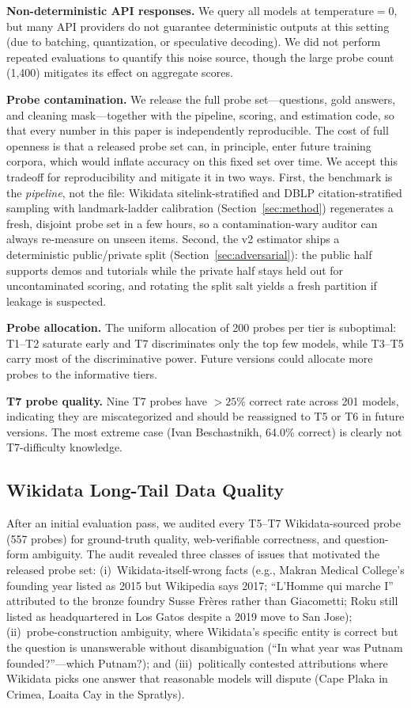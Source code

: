 \documentclass[11pt]{article}
\begin{document}
\textbf{Non-deterministic API responses.} We query all models at temperature${}=0$, but many API providers do not guarantee deterministic outputs at this setting (due to batching, quantization, or speculative decoding). We did not perform repeated evaluations to quantify this noise source, though the large probe count (1{,}400) mitigates its effect on aggregate scores.

\textbf{Probe contamination.} We release the full probe set---questions, gold answers, and cleaning mask---together with the pipeline, scoring, and estimation code, so that every number in this paper is independently reproducible. The cost of full openness is that a released probe set can, in principle, enter future training corpora, which would inflate accuracy on this fixed set over time. We accept this tradeoff for reproducibility and mitigate it in two ways. First, the benchmark is the \emph{pipeline}, not the file: Wikidata sitelink-stratified and DBLP citation-stratified sampling with landmark-ladder calibration (Section~\ref{sec:method}) regenerates a fresh, disjoint probe set in a few hours, so a contamination-wary auditor can always re-measure on unseen items. Second, the v2 estimator ships a deterministic public/private split (Section~\ref{sec:adversarial}): the public half supports demos and tutorials while the private half stays held out for uncontaminated scoring, and rotating the split salt yields a fresh partition if leakage is suspected.

\textbf{Probe allocation.} The uniform allocation of 200 probes per tier is suboptimal: T1--T2 saturate early and T7 discriminates only the top few models, while T3--T5 carry most of the discriminative power. Future versions could allocate more probes to the informative tiers.

\textbf{T7 probe quality.} Nine T7 probes have $>25\%$ correct rate across 201 models, indicating they are miscategorized and should be reassigned to T5 or T6 in future versions. The most extreme case (Ivan Beschastnikh, 64.0\% correct) is clearly not T7-difficulty knowledge.

\subsection{Wikidata Long-Tail Data Quality}
\label{sec:wikidata-audit}

After an initial evaluation pass, we audited every T5--T7 Wikidata-sourced probe (557 probes) for ground-truth quality, web-verifiable correctness, and question-form ambiguity. The audit revealed three classes of issues that motivated the released probe set: (i)~Wikidata-itself-wrong facts (e.g., Makran Medical College's founding year listed as 2015 but Wikipedia says 2017; ``L'Homme qui marche I'' attributed to the bronze foundry Susse Fr\`{e}res rather than Giacometti; Roku still listed as headquartered in Los Gatos despite a 2019 move to San Jose); (ii)~probe-construction ambiguity, where Wikidata's specific entity is correct but the question is unanswerable without disambiguation (``In what year was Putnam founded?''---which Putnam?); and (iii)~politically contested attributions where Wikidata picks one answer that reasonable models will dispute (Cape Plaka in Crimea, Loaita Cay in the Spratlys).
\end{document}
